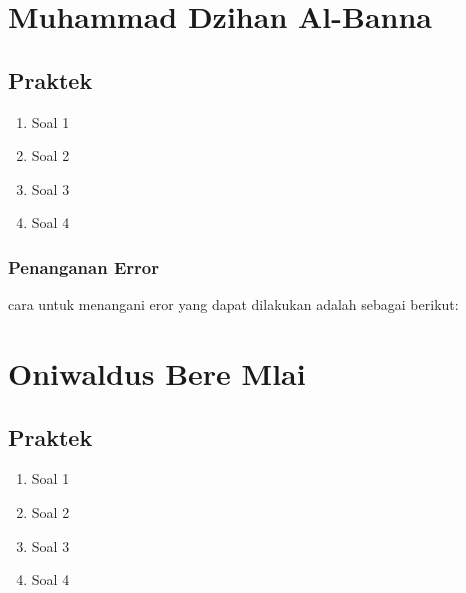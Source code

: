 \section{Muhammad Dzihan Al-Banna}
\subsection{Praktek}
\begin{enumerate}
\item Soal 1


\item Soal 2


\item Soal 3


\item Soal 4


\end{enumerate}

\subsubsection{Penanganan Error}
cara untuk menangani eror yang dapat dilakukan adalah sebagai berikut:




\section{Oniwaldus Bere Mlai}
\subsection{Praktek}
\begin{enumerate}
\item Soal 1


\item Soal 2


\item Soal 3


\item Soal 4


\end{enumerate}






